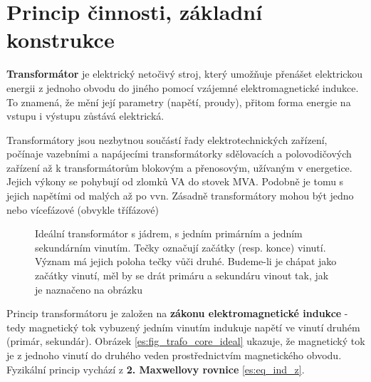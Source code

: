   \section{Princip činnosti, základní konstrukce}
    \begin{definition}
      \textbf{Transformátor} je elektrický netočivý stroj, který umožňuje pře\-nášet elektrickou 
      energii z jednoho obvodu do jiného pomocí vzá\-jemné elektromagnetické indukce. To znamená, 
      že mění její parametry (napětí, proudy), přitom forma energie na vstupu i výstupu zůstává 
      elektrická.
    \end{definition}

    Transformátory jsou nezbytnou součástí řady elektrotechnických zařízení, počínaje vazebními a 
    napájecími transformátorky sdělovacích a polovodičových zařízení až k transformátorům blokovým 
    a přenosovým, užívaným v energetice. Jejich výkony se pohybují od zlomků VA do stovek MVA. 
    Podobně je tomu s jejich napětími od malých až po vvn. Zásadně transformátory  mohou být jedno 
    nebo vícefázové (obvykle třífázové)

    \begin{figure}[ht!]
      \centering
        {}                \newline
        {}
      \caption{Ideální transformátor s jádrem, s jedním primárním a jedním sekundárním 
              vinutím. Tečky označují začátky (resp. konce) vinutí. Význam má jejich poloha tečky 
              vůči druhé. Budeme-li je chápat jako začátky vinutí, měl by se drát primáru a 
              sekundáru vinout tak, jak je naznačeno na obrázku}
      \label{es:fig_trafo_ideal}
    \end{figure}
    Princip transformátoru je založen na \textbf{zákonu elektromagnetické indukce} - tedy 
    magnetický tok vybuzený jedním vinutím indukuje napětí ve vinutí druhém (primár, sekundár). 
    Obrázek \ref{es:fig_trafo_core_ideal} ukazuje, že magnetický tok je z jednoho vinutí do druhého 
    veden  prostřednictvím magnetického obvodu. Fyzikální princip vychází z \textbf{2. Maxwellovy
    rovnice} \ref{es:eq_ind_z}.

